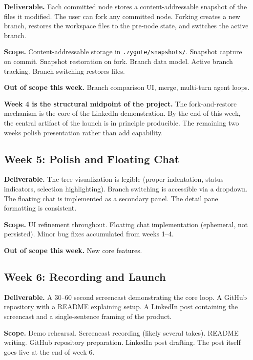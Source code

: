 \documentclass[11pt,letterpaper]{article}
\begin{document}
\textbf{Deliverable.} Each committed node stores a content-addressable snapshot of the files it modified. The user can fork any committed node. Forking creates a new branch, restores the workspace files to the pre-node state, and switches the active branch.

\textbf{Scope.} Content-addressable storage in \texttt{.zygote/snapshots/}. Snapshot capture on commit. Snapshot restoration on fork. Branch data model. Active branch tracking. Branch switching restores files.

\textbf{Out of scope this week.} Branch comparison UI, merge, multi-turn agent loops.

\begin{notebox}
\textbf{Week 4 is the structural midpoint of the project.} The fork-and-restore mechanism is the core of the LinkedIn demonstration. By the end of this week, the central artifact of the launch is in principle producible. The remaining two weeks polish presentation rather than add capability.
\end{notebox}

\subsection*{Week 5: Polish and Floating Chat}

\textbf{Deliverable.} The tree visualization is legible (proper indentation, status indicators, selection highlighting). Branch switching is accessible via a dropdown. The floating chat is implemented as a secondary panel. The detail pane formatting is consistent.

\textbf{Scope.} UI refinement throughout. Floating chat implementation (ephemeral, not persisted). Minor bug fixes accumulated from weeks 1--4.

\textbf{Out of scope this week.} New core features.

\subsection*{Week 6: Recording and Launch}

\textbf{Deliverable.} A 30--60 second screencast demonstrating the core loop. A GitHub repository with a README explaining setup. A LinkedIn post containing the screencast and a single-sentence framing of the product.

\textbf{Scope.} Demo rehearsal. Screencast recording (likely several takes). README writing. GitHub repository preparation. LinkedIn post drafting. The post itself goes live at the end of week 6.
\end{document}
